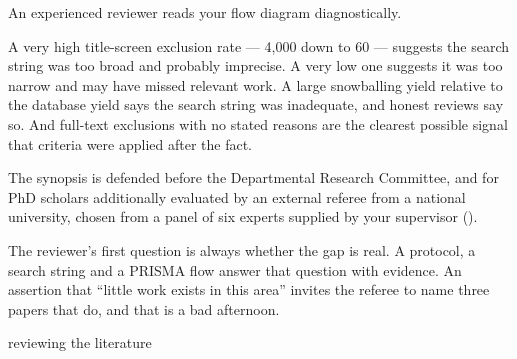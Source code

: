 \begin{conceptbox}
An experienced reviewer reads your flow diagram diagnostically.

\medskip
A very high title-screen exclusion rate --- 4,000 down to 60 --- suggests the
search string was too broad and probably imprecise. A very low one suggests it
was too narrow and may have missed relevant work. A large snowballing yield
relative to the database yield says the search string was inadequate, and
honest reviews say so. And full-text exclusions with no stated reasons are the
clearest possible signal that criteria were applied after the fact.
\end{conceptbox}

\begin{regbox}
The synopsis is defended before the Departmental Research Committee, and for
PhD scholars additionally evaluated by an external referee from a national
university, chosen from a panel of six experts supplied by your supervisor
().

\medskip
The reviewer's first question is always whether the gap is real. A protocol, a
search string and a PRISMA flow answer that question with evidence. An
assertion that ``little work exists in this area'' invites the referee to name
three papers that do, and that is a bad afternoon.
\end{regbox}

\begin{traditions}{reviewing the literature}
\end{traditions}

